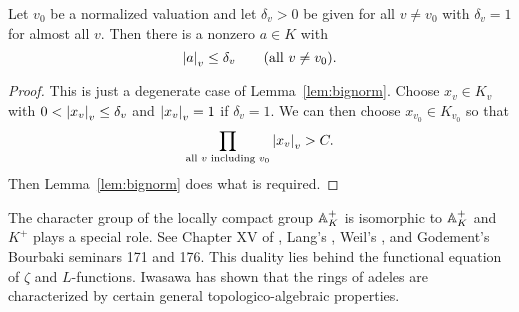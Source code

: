 \begin{corollary}\label{cor:small_a}
Let $v_0$ be a normalized valuation and let $\delta_v>0$ be given
for all $v\neq v_0$ with $\delta_v = 1$ for almost all $v$.  Then 
there is a nonzero $a\in K$ with
$$
  \abs{a}_v \leq \delta_v\qquad\text{(all $v\neq v_0$)}.
$$
\end{corollary}
\begin{proof}
This is just a degenerate case of Lemma~\ref{lem:bignorm}.
Choose $x_v\in K_v$ with $0< \abs{x_v}_v \leq \delta_v$
and $\abs{x_v}_v=1$ if $\delta_v=1$.  We can then choose
$x_{v_0}\in K_{v_0}$ so that
$$
\prod_{\text{all $v$ including $v_0$}} \abs{x_v}_v > C.
$$
Then Lemma~\ref{lem:bignorm} does what is required.
\end{proof}

\begin{remark}
  The character group of the locally compact group $\AA_K^+$ is
  isomorphic to $\AA_K^+$ and $K^+$ plays a special role.  See Chapter
  XV of \cite{cassels-frohlich}, Lang's \cite{lang:algebraic_numbers},
  Weil's \cite{weil:adeles}, and Godement's Bourbaki seminars 171 and
  176.  This duality lies behind the functional equation of $\zeta$
  and $L$-functions.  Iwasawa has shown \cite{iwasawa:adele} that the
  rings of adeles are characterized by certain general
  topologico-algebraic properties.
\end{remark}

